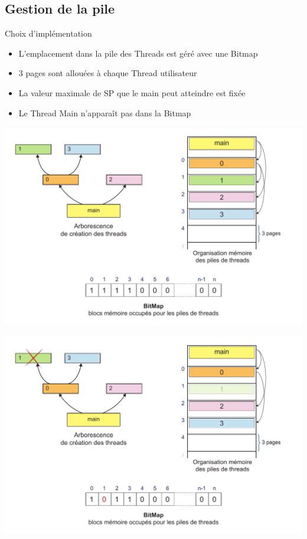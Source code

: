 \documentclass{beamer}
\begin{document}
\subsection{Gestion de la pile}
\begin{frame}
	\begin{block}{Choix d’implémentation }
		\begin{itemize}
			\item L'emplacement dans la pile des Threads est géré avec une Bitmap
			\item 3 pages sont allouées à chaque Thread utilisateur 
			\item La valeur maximale de SP que le main peut atteindre est fixée 
			\item Le Thread Main n’apparaît pas dans la Bitmap
		\end{itemize}
	\end{block}
\end{frame}

\begin{frame}
  	\begin{center}
	  	\includegraphics[scale=0.27]{images/FS3.png}
  	\end{center}
\end{frame}

\begin{frame}
  	\begin{center}
	  	\includegraphics[scale=0.27]{images/FS4.png}
  	\end{center}
\end{frame}
\end{document}
